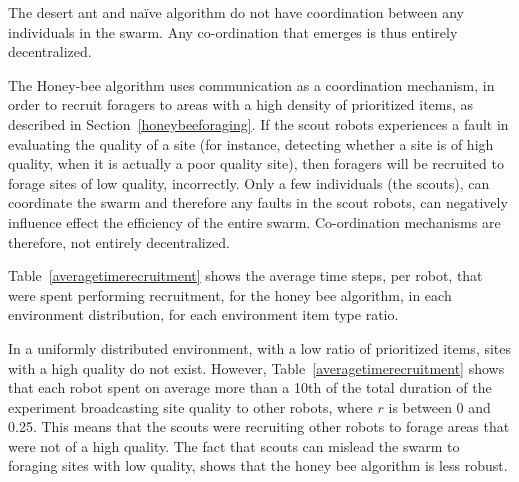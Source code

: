 
The desert ant and na\"ive algorithm do not have coordination between any individuals in the swarm. Any co-ordination that emerges is thus entirely decentralized. 

The Honey-bee algorithm uses communication as a coordination mechanism, in order to recruit foragers to areas with a high density of prioritized items, as described in Section~\ref{honeybeeforaging}. If the scout robots experiences a fault in evaluating the quality of a site (for instance, detecting whether a site is of high quality, when it is actually a poor quality site), then foragers will be recruited to forage sites of low quality, incorrectly. Only a few individuals (the scouts), can coordinate the swarm and therefore any faults in the scout robots, can negatively influence effect the efficiency of the entire swarm. Co-ordination mechanisms are therefore, not entirely decentralized.

Table~\ref{averagetimerecruitment} shows the average time steps, per robot, that were spent performing recruitment, for the honey bee algorithm, in each environment distribution, for each environment item type ratio. 

In a uniformly distributed environment, with a low ratio of prioritized items, sites with a high quality do not exist. However, Table~\ref{averagetimerecruitment} shows that each robot spent on average more than a 10th of the total duration of the experiment broadcasting site quality to other robots, where $r$ is between 0 and 0.25. This means that the scouts were recruiting other robots to forage areas that were not of a high quality. The fact that scouts can mislead the swarm to foraging sites with low quality, shows that the honey bee algorithm is less robust.

